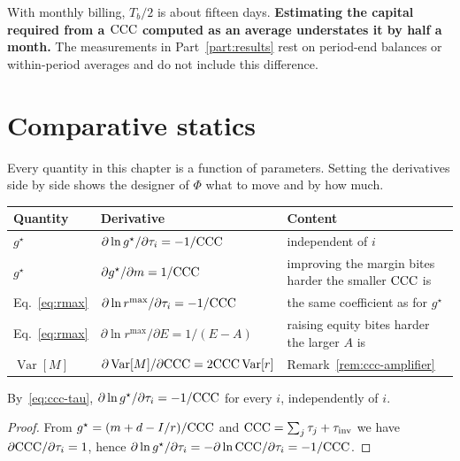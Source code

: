 With monthly billing, $T_b/2$ is about fifteen days.
\textbf{Estimating the capital required from a $\mathrm{CCC}$ computed as an average understates it
by half a month.} The measurements in Part~\ref{part:results} rest on period-end balances or
within-period averages and do not include this difference.

\section{Comparative statics}
\label{sec:comparative-statics}

Every quantity in this chapter is a function of parameters. Setting the derivatives side by
side shows the designer of $\Phi$ what to move and by how much.

\begin{center}
\begin{tabularx}{\textwidth}{@{}llX@{}}
\toprule
Quantity & Derivative & Content \\
\midrule
$g^\star$ & $\partial\ln g^\star/\partial\tau_i = -1/\mathrm{CCC}$ & independent of $i$ \\
$g^\star$ & $\partial g^\star/\partial m = 1/\mathrm{CCC}$ & improving the margin bites harder the smaller $\mathrm{CCC}$ is \\
Eq.~\eqref{eq:rmax} & $\partial\ln r^{\max}/\partial\tau_i = -1/\mathrm{CCC}$ & the same coefficient as for $g^\star$ \\
Eq.~\eqref{eq:rmax} & $\partial\ln r^{\max}/\partial E = 1/(E-A)$ & raising equity bites harder the larger $A$ is \\
$\operatorname{Var}[M]$ & $\partial\operatorname{Var}[M]/\partial\mathrm{CCC} = 2\mathrm{CCC}\operatorname{Var}[r]$ & Remark~\ref{rem:ccc-amplifier} \\
\bottomrule
\end{tabularx}
\label{tab:comparative-statics}
\end{center}

\begin{proposition}
\label{prop:tau-substitution}
By~\eqref{eq:ccc-tau}, $\partial\ln g^\star/\partial\tau_i = -1/\mathrm{CCC}$ for every $i$,
independently of $i$.
\end{proposition}

\begin{proof}
From $g^\star=(m+d-I/r)/\mathrm{CCC}$ and $\mathrm{CCC}=\sum_j\tau_j+\tau_{\mathrm{inv}}$ we have
$\partial\mathrm{CCC}/\partial\tau_i=1$, hence
$\partial\ln g^\star/\partial\tau_i = -\partial\ln\mathrm{CCC}/\partial\tau_i = -1/\mathrm{CCC}$.
\end{proof}

